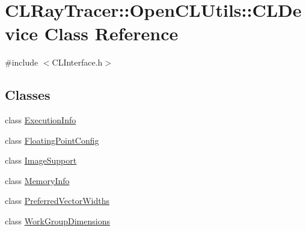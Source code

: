 \hypertarget{class_c_l_ray_tracer_1_1_open_c_l_utils_1_1_c_l_device}{}\section{C\+L\+Ray\+Tracer\+:\+:Open\+C\+L\+Utils\+:\+:C\+L\+Device Class Reference}
\label{class_c_l_ray_tracer_1_1_open_c_l_utils_1_1_c_l_device}


{\ttfamily \#include $<$C\+L\+Interface.\+h$>$}

\subsection*{Classes}
\begin{DoxyCompactItemize}
\item 
class \hyperlink{class_c_l_ray_tracer_1_1_open_c_l_utils_1_1_c_l_device_1_1_execution_info}{Execution\+Info}
\item 
class \hyperlink{class_c_l_ray_tracer_1_1_open_c_l_utils_1_1_c_l_device_1_1_floating_point_config}{Floating\+Point\+Config}
\item 
class \hyperlink{class_c_l_ray_tracer_1_1_open_c_l_utils_1_1_c_l_device_1_1_image_support}{Image\+Support}
\item 
class \hyperlink{class_c_l_ray_tracer_1_1_open_c_l_utils_1_1_c_l_device_1_1_memory_info}{Memory\+Info}
\item 
class \hyperlink{class_c_l_ray_tracer_1_1_open_c_l_utils_1_1_c_l_device_1_1_preferred_vector_widths}{Preferred\+Vector\+Widths}
\item 
class \hyperlink{class_c_l_ray_tracer_1_1_open_c_l_utils_1_1_c_l_device_1_1_work_group_dimensions}{Work\+Group\+Dimensions}
\end{DoxyCompactItemize}
